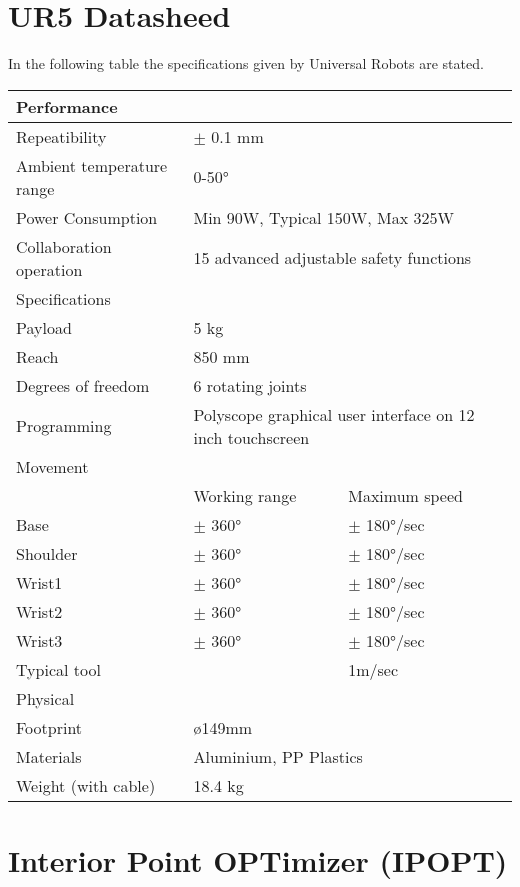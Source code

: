 \begin{appendices}
\chapter{UR5 Datasheed}
\label{appB}
In the following table the specifications given by Universal Robots are stated. 
\begin{table}
	\begin{tabular}{p{4cm} | p{3cm} p{3cm}}
		\hline
		Performance & \multicolumn{2}{l}{ } \\
		\hline \hline
		Repeatibility & \multicolumn{2}{l}{$\pm$ 0.1 mm} \\
		Ambient temperature range & \multicolumn{2}{l}{0-50°} \\
		Power Consumption  & \multicolumn{2}{l}{Min 90W, Typical 150W, Max 325W} \\
		Collaboration operation & \multicolumn{2}{l}{15 advanced adjustable safety functions} \\
		\hline \hline
		Specifications & \multicolumn{2}{l}{ }\\
		\hline \hline 
		Payload & \multicolumn{2}{l}{5 kg} \\
		Reach & \multicolumn{2}{l}{850 mm} \\
		Degrees of freedom & \multicolumn{2}{l}{6 rotating joints} \\
		Programming & \multicolumn{2}{l}{Polyscope graphical user interface on 12 inch touchscreen} \\
		\hline \hline
		Movement & & \\
		\hline 
		& Working range & Maximum speed \\
		\hline \hline
		Base & $\pm$ 360°  & $\pm$ 180°/sec \\
		Shoulder & $\pm$ 360° & $\pm$ 180°/sec \\
		Wrist1 & $\pm$ 360° & $\pm$ 180°/sec \\
		Wrist2 & $\pm$ 360° & $\pm$ 180°/sec \\
		Wrist3 & $\pm$ 360° & $\pm$ 180°/sec \\
		Typical tool & & 1m/sec \\
		\hline \hline
		Physical & \multicolumn{2}{l}{ }\\
		\hline \hline
		Footprint & \multicolumn{2}{l}{\o 149mm} \\
		Materials & \multicolumn{2}{l}{Aluminium, PP Plastics} \\
		Weight (with cable) & 18.4 kg 
	\end{tabular}
\end{table}


\chapter{Interior Point OPTimizer (IPOPT)}
\label{appC}

\end{appendices}





